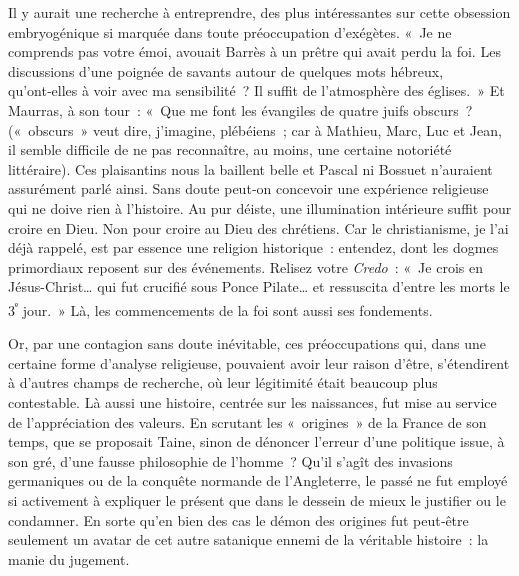 \documentclass[french,twoside]{book} %
\newcommand{\astermono}{\medskip\centerline{\color{rubric}\large\selectfont{\syms ✻}}\medskip\par}%
\begin{document}
\noindent Il y aurait une recherche à entreprendre, des plus intéressantes sur cette obsession embryogénique si marquée dans toute préoccupation d’exégètes. « Je ne comprends pas votre émoi, avouait Barrès à un prêtre qui avait perdu la foi. Les discussions d’une poignée de savants autour de quelques mots hébreux, qu’ont‑elles à voir avec ma sensibilité ? Il suffit de l’atmosphère des églises. » Et Maurras, à son tour : « Que me font les évangiles de quatre juifs obscurs ? (« obscurs » veut dire, j’imagine, plé­béiens ; car à Mathieu, Marc, Luc et Jean, il semble difficile de ne pas reconnaître, au moins, une certaine notoriété littéraire). Ces plaisantins nous la baillent belle et Pascal ni Bossuet n’auraient assurément parlé ainsi. Sans doute peut‑on concevoir une expérience religieuse qui ne doive rien à l’histoire. Au pur déiste, une illumination intérieure suffit pour croire en Dieu. Non pour croire au Dieu des chrétiens. Car le chris­tianisme, je l’ai déjà rappelé, est par essence une religion historique : entendez, dont les dogmes primordiaux reposent sur des événements. Relisez votre \emph{Credo} : « Je crois en Jésus-Christ… qui fut crucifié sous Ponce Pilate… et ressuscita d’entre les morts le 3\textsuperscript{ᵉ} jour. » Là, les commen­cements de la foi sont aussi ses fondements.\par
Or, par une contagion sans doute inévitable, ces préoccupations qui, dans une certaine forme d’analyse religieuse, pouvaient avoir leur raison  
\label{p7} d’être, s’étendirent à d’autres champs de recherche, où leur légitimité était beaucoup plus contestable. Là aussi une histoire, centrée sur les naissances, fut mise au service de l’appréciation des valeurs. En scrutant les « origines » de la France de son temps, que se proposait Taine, sinon de dénoncer l’erreur d’une politique issue, à son gré, d’une fausse philo­sophie de l’homme ? Qu’il s’agît des invasions germaniques ou de la conquête normande de l’Angleterre, le passé ne fut employé si activement à expliquer le présent que dans le dessein de mieux le justifier ou le con­damner. En sorte qu’en bien des cas le démon des origines fut peut‑être seulement un avatar de cet autre satanique ennemi de la véritable histoire : la manie du jugement.\par

\astermono
\end{document}

